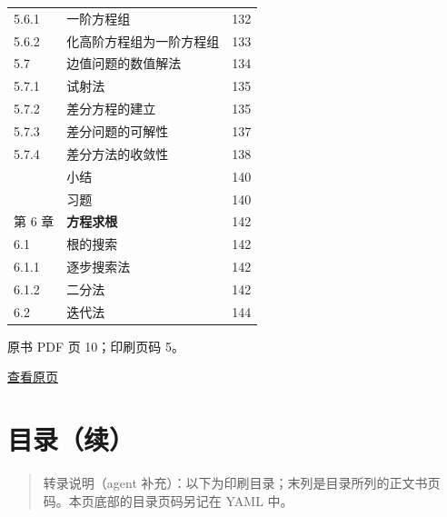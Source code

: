 {\begin{longtable}[]{@{}llr@{}}
5.6.1 & 一阶方程组 & 132 \\
5.6.2 & 化高阶方程组为一阶方程组 & 133 \\
5.7 & 边值问题的数值解法 & 134 \\
5.7.1 & 试射法 & 135 \\
5.7.2 & 差分方程的建立 & 135 \\
5.7.3 & 差分问题的可解性 & 137 \\
5.7.4 & 差分方法的收敛性 & 138 \\
& 小结 & 140 \\
& 习题 & 140 \\
第 6 章 & \textbf{方程求根} & 142 \\
6.1 & 根的搜索 & 142 \\
6.1.1 & 逐步搜索法 & 142 \\
6.1.2 & 二分法 & 142 \\
6.2 & 迭代法 & 144 \\
\end{longtable}
}

\clearpage

原书 PDF 页 10；印刷页码 5。

\href{source-images/pdf-010.jpeg}{查看原页}

\section{目录（续）}\label{front-ux76eeux5f55ux7eed-3}

\begin{quote}
转录说明（agent 补充）：以下为印刷目录；末列是目录所列的正文书页码。本页底部的目录页码另记在 YAML 中。
\end{quote}

